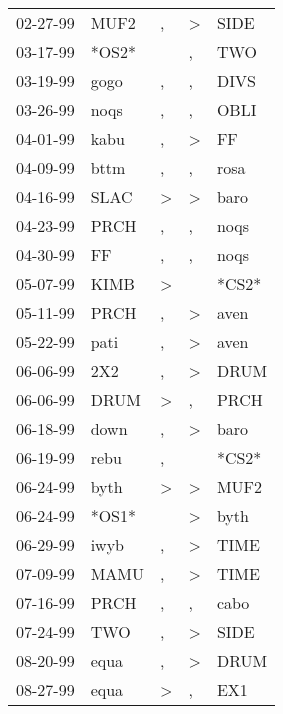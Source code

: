 \begin{supertabular}{lllll}
 02-27-99 &   MUF2 &                , &     \textgreater &   SIDE \\
 03-17-99 &  *OS2* &                  &                , &    TWO \\
 03-19-99 &   gogo &                , &                , &   DIVS \\
 03-26-99 &   noqs &                , &                , &   OBLI \\
 04-01-99 &   kabu &                , &     \textgreater &     FF \\
 04-09-99 &   bttm &                , &                , &   rosa \\
 04-16-99 &   SLAC &     \textgreater &     \textgreater &   baro \\
 04-23-99 &   PRCH &                , &                , &   noqs \\
 04-30-99 &     FF &                , &                , &   noqs \\
 05-07-99 &   KIMB &     \textgreater &                  &  *CS2* \\
 05-11-99 &   PRCH &                , &     \textgreater &   aven \\
 05-22-99 &   pati &                , &     \textgreater &   aven \\
 06-06-99 &    2X2 &                , &     \textgreater &   DRUM \\
 06-06-99 &   DRUM &     \textgreater &                , &   PRCH \\
 06-18-99 &   down &                , &     \textgreater &   baro \\
 06-19-99 &   rebu &                , &                  &  *CS2* \\
 06-24-99 &   byth &     \textgreater &     \textgreater &   MUF2 \\
 06-24-99 &  *OS1* &                  &     \textgreater &   byth \\
 06-29-99 &   iwyb &                , &     \textgreater &   TIME \\
 07-09-99 &   MAMU &                , &     \textgreater &   TIME \\
 07-16-99 &   PRCH &                , &                , &   cabo \\
 07-24-99 &    TWO &                , &     \textgreater &   SIDE \\
 08-20-99 &   equa &                , &     \textgreater &   DRUM \\
 08-27-99 &   equa &     \textgreater &                , &    EX1 \\

\end{supertabular}
